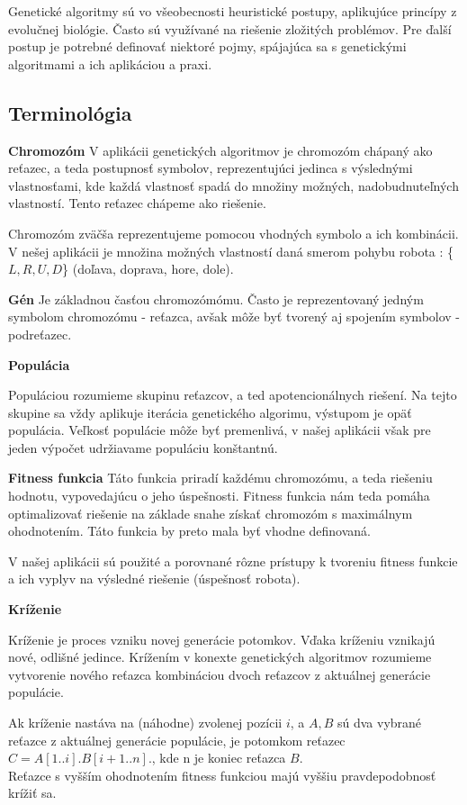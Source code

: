 \documentclass[10pt]{paper}
\begin{document}
Genetické algoritmy sú vo všeobecnosti heuristické postupy, aplikujúce princípy z evolučnej biológie. Často sú využívané na riešenie zložitých problémov. Pre ďalší postup je potrebné definovať niektoré pojmy, spájajúca sa s genetickými algoritmami a ich aplikáciou a praxi.

\subsection{Terminológia}


\noindent \textbf{Chromozóm}
V aplikácii genetických algoritmov je chromozóm chápaný ako reťazec, a teda postupnosť symbolov, reprezentujúci jedinca s výslednými vlastnosťami, kde každá vlastnosť spadá do množiny možných, nadobudnuteľných vlastností. Tento reťazec chápeme ako riešenie.

Chromozóm zväčša reprezentujeme pomocou vhodných symbolo a ich kombinácii. V nešej aplikácii je množina možných vlastností daná smerom pohybu robota : \{$L,R,U,D$\} (doľava, doprava, hore, dole).

\noindent \textbf{Gén}
Je základnou časťou chromozómómu. Často je reprezentovaný jedným symbolom chromozómu - reťazca, avšak môže byť tvorený aj spojením symbolov - podreťazec.

\noindent \textbf{Populácia}

Populáciou rozumieme skupinu reťazcov, a ted apotencionálnych riešení. Na tejto skupine sa vždy aplikuje iterácia genetického algorimu, výstupom je opäť populácia. Veľkosť populácie môže byť premenlivá, v našej aplikácii však pre jeden výpočet udržiavame populáciu konštantnú.

\noindent \textbf{Fitness funkcia}
Táto funkcia priradí každému chromozómu, a teda riešeniu hodnotu, vypovedajúcu o jeho úspešnosti. Fitness funkcia nám teda pomáha optimalizovať riešenie na základe snahe získať chromozóm s maximálnym ohodnotením. Táto funkcia by preto mala byť vhodne definovaná.

V našej aplikácii sú použité a porovnané rôzne prístupy k tvoreniu fitness funkcie a ich vyplyv na výsledné riešenie (úspešnosť robota).

\noindent \textbf{Kríženie}

Kríženie je proces vzniku novej generácie potomkov. Vďaka kríženiu vznikajú nové, odlišné jedince. Krížením v konexte genetických algoritmov rozumieme vytvorenie nového reťazca kombináciou dvoch reťazcov z aktuálnej generácie populácie. 

Ak kríženie nastáva na (náhodne) zvolenej pozícii $i$, a $A,B$ sú dva vybrané reťazce z aktuálnej generácie populácie, je potomkom reťazec $C = A[1..i].B[i+1..n].$, kde n je koniec reťazca $B$.\\
Reťazce s vyšším ohodnotením fitness funkciou majú vyššiu pravdepodobnosť krížiť sa.
\end{document}
